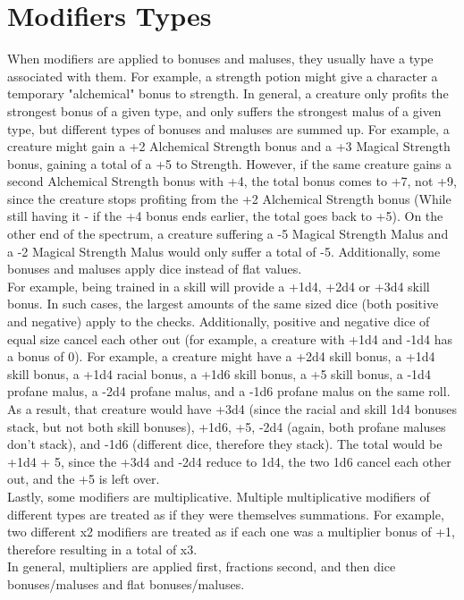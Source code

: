 \section{Modifiers Types}\label{sec:modifierTypes}
When modifiers are applied to bonuses and maluses, they usually have a type associated with them.
For example, a strength potion might give a character a temporary "alchemical" bonus to strength.
In general, a creature only profits the strongest bonus of a given type, and only suffers the strongest malus of a given type, but different types of bonuses and maluses are summed up.
For example, a creature might gain a +2 Alchemical Strength bonus and a +3 Magical Strength bonus, gaining a total of a +5 to Strength.
However, if the same creature gains a second Alchemical Strength bonus with +4, the total bonus comes to +7, not +9, since the creature stops profiting from the +2 Alchemical Strength bonus (While still having it - if the +4 bonus ends earlier, the total goes back to +5).
On the other end of the spectrum, a creature suffering a -5 Magical Strength Malus and a -2 Magical Strength Malus would only suffer a total of -5.
Additionally, some bonuses and maluses apply dice instead of flat values.\\
For example, being trained in a skill will provide a +1d4, +2d4 or +3d4 skill bonus.
In such cases, the largest amounts of the same sized dice (both positive and negative) apply to the checks.
Additionally, positive and negative dice of equal size cancel each other out (for example, a creature with +1d4 and -1d4 has a bonus of 0).
For example, a creature might have a +2d4 skill bonus, a +1d4 skill bonus, a +1d4 racial bonus, a +1d6 skill bonus, a +5 skill bonus, a -1d4 profane malus, a -2d4 profane malus, and a -1d6 profane malus on the same roll.
As a result, that creature would have +3d4 (since the racial and skill 1d4 bonuses stack, but not both skill bonuses), +1d6, +5, -2d4 (again, both profane maluses don't stack), and -1d6 (different dice, therefore they stack).
The total would be +1d4 + 5, since the +3d4 and -2d4 reduce to 1d4, the two 1d6 cancel each other out, and the +5 is left over.\\
Lastly, some modifiers are multiplicative.
Multiple multiplicative modifiers of different types are treated as if they were themselves summations.
For example, two different x2 modifiers are treated as if each one was a multiplier bonus of +1, therefore resulting in a total of x3.\\
In general, multipliers are applied first, fractions second, and then dice bonuses/maluses and flat bonuses/maluses.\\

